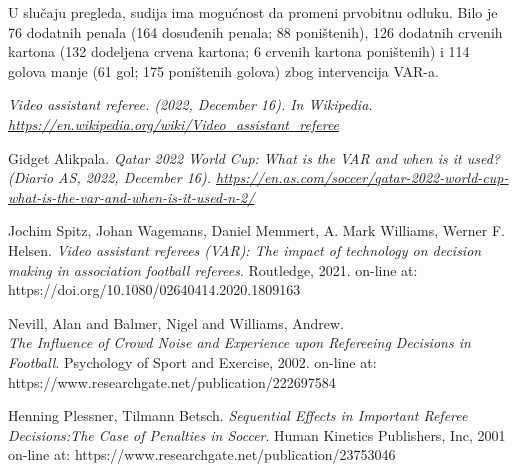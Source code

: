 \documentclass[a4paper]{article}
\begin{document}
U slučaju pregleda, sudija ima mogućnost da promeni prvobitnu odluku. Bilo je 76 dodatnih penala (164 dosuđenih penala; 88 poništenih), 126 dodatnih crvenih kartona (132 dodeljena crvena kartona; 6 crvenih kartona poništenih) i 114 golova manje (61 gol; 175 poništenih golova) zbog intervencija VAR-a.



\appendix

\begin{thebibliography}{9}

 \em{Video assistant referee}. (2022, December 16). In Wikipedia. \url{https://en.wikipedia.org/wiki/Video_assistant_referee}  

 Gidget Alikpala. \em{Qatar 2022 World Cup: What is the VAR and when is it used?} (Diario AS, 2022, December 16). \url{https://en.as.com/soccer/qatar-2022-world-cup-what-is-the-var-and-when-is-it-used-n-2/}

\bibitem{} Jochim Spitz, Johan Wagemans, Daniel Memmert, A. Mark Williams, Werner F. Helsen. \emph{Video assistant referees (VAR): The impact of technology on decision making in association football referees}. Routledge, 2021. on-line at: https://doi.org/10.1080/02640414.2020.1809163

\bibitem{} Nevill, Alan and Balmer, Nigel and Williams, Andrew. \\ \emph{The Influence of Crowd Noise and Experience upon Refereeing Decisions in Football}. Psychology of Sport and Exercise, 2002. on-line at: https://www.researchgate.net/publication/222697584

\bibitem{} Henning Plessner, Tilmann Betsch. \emph{Sequential Effects in Important Referee Decisions:The Case of Penalties in Soccer}. Human Kinetics Publishers, Inc, 2001 on-line at: https://www.researchgate.net/publication/23753046


\end{thebibliography}
\end{document}
